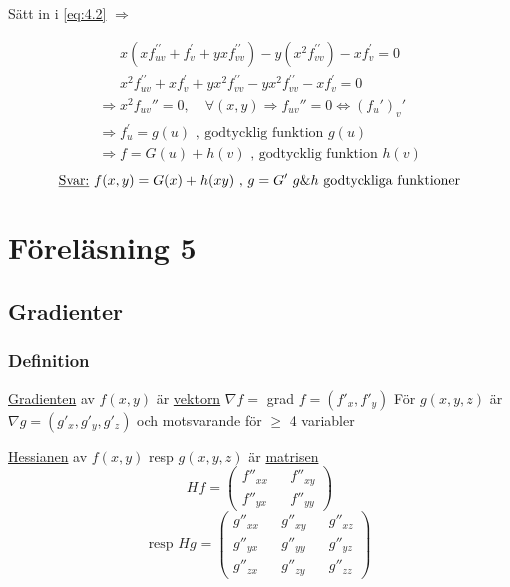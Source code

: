 \documentclass{article}
\begin{document}
Sätt in i \eqref{eq:4.2} \(\Rightarrow\)

\[
\begin{split}
	x(xf_{uv}^{\prime\prime}+f_{v}^{\prime}+yxf_{vv}^{\prime\prime}) - y(x^2f_{vv}^{\prime\prime}) - xf_{v}^{\prime} = 0 \\
	x^2 f_{uv}^{\prime\prime}+xf_{v}^{\prime}+yx^2f_{vv}^{\prime\prime} - yx^2f_{vv}^{\prime\prime} - xf_{v}^{\prime} = 0
\end{split}
\]
\[
\begin{split}
	\Rightarrow x^2f_{uv}'' = 0, \quad \forall (x,y) 
	\Rightarrow f_{uv}'' = 0 \iff (f_{u}')_{v}' \\
	\Rightarrow f_{u}^{\prime} = g(u) \text{ , godtycklig funktion }g(u) \\
	\Rightarrow f = G(u) + h(v) \text{ , godtycklig funktion }h(v)
\end{split}
\]
\[
	\text{\underline{Svar:} } f(x,y) = G(x) + h(xy) \text{ , }g=G^{\prime}\text{  }g\text{\&}h\text{ godtyckliga funktioner}
\]

\newpage
\section{Föreläsning 5}

\subsection{Gradienter}

\subsubsection{Definition}

\underline{Gradienten} av \(f(x,y)\) är \underline{vektorn} \(\nabla f =\) grad \(f = (f'_{x},f'_{y})\) \newline
För \(g(x,y,z)\) är \(\nabla g = (g'_{x},g'_{y},g'_{z})\) och motsvarande för \(\geq\) 4 variabler \newline

\underline{Hessianen} av \(f(x,y)\) resp \(g(x,y,z)\) är \underline{matrisen} 
\[Hf=
\begin{pmatrix}
f''_{xx} && f''_{xy} \\
f''_{yx} && f''_{yy}
\end{pmatrix}\] 
\[\text{resp } Hg = 
\begin{pmatrix}
g''_{xx} && g''_{xy} && g''_{xz} \\
g''_{yx} && g''_{yy} && g''_{yz} \\
g''_{zx} && g''_{zy} && g''_{zz}
\end{pmatrix}\]
\end{document}
